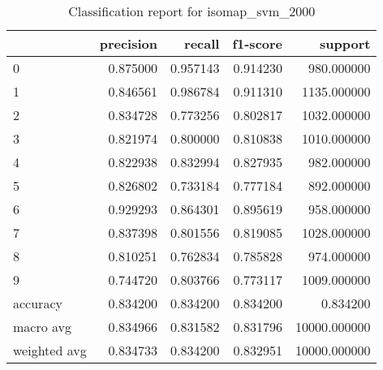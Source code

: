\begin{table}[htb!]
\centering
\caption{Classification report for isomap_svm_2000}
\label{tab:classification-report-isomap_svm_2000}
\begin{tabular}{lrrrr}
\toprule
 & precision & recall & f1-score & support \\
\midrule
0 & 0.875000 & 0.957143 & 0.914230 & 980.000000 \\
1 & 0.846561 & 0.986784 & 0.911310 & 1135.000000 \\
2 & 0.834728 & 0.773256 & 0.802817 & 1032.000000 \\
3 & 0.821974 & 0.800000 & 0.810838 & 1010.000000 \\
4 & 0.822938 & 0.832994 & 0.827935 & 982.000000 \\
5 & 0.826802 & 0.733184 & 0.777184 & 892.000000 \\
6 & 0.929293 & 0.864301 & 0.895619 & 958.000000 \\
7 & 0.837398 & 0.801556 & 0.819085 & 1028.000000 \\
8 & 0.810251 & 0.762834 & 0.785828 & 974.000000 \\
9 & 0.744720 & 0.803766 & 0.773117 & 1009.000000 \\
accuracy & 0.834200 & 0.834200 & 0.834200 & 0.834200 \\
macro avg & 0.834966 & 0.831582 & 0.831796 & 10000.000000 \\
weighted avg & 0.834733 & 0.834200 & 0.832951 & 10000.000000 \\
\bottomrule
\end{tabular}
\end{table}
